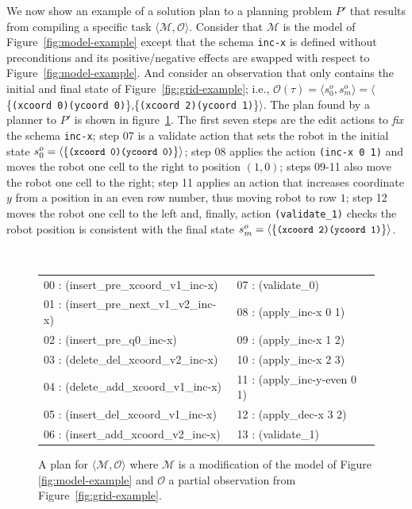 \documentclass[letterpaper]{article} %
\newcommand{\tup}[1]{{\langle #1 \rangle}}
\begin{document}
We now show an example of a solution plan to a planning problem $P'$ that results from compiling a specific task $\tup{\mathcal{M},\mathcal{O}}$. Consider that $\mathcal{M}$ is the model of Figure~\ref{fig:model-example} except that the schema {\tt\small inc-x} is defined without preconditions and its positive/negative effects are swapped with respect to Figure~\ref{fig:model-example}. And consider an observation that only contains the initial and final state of Figure~\ref{fig:grid-example}; i.e., $\mathcal{O(\tau)}=\tup{s_0^o,s_m^o}=\langle$\{{\texttt{\small{(xcoord 0)(ycoord 0)}}}\},\{{\texttt{\small{(xcoord 2)(ycoord 1)}}}\}$\rangle $. The plan found by a planner to $P'$ is shown in figure~\ref{fig:plan-pdistance}. The first seven steps are the edit actions to \emph{fix} the schema {\tt\small inc-x}; step 07 is a validate action that sets the robot in the initial state $s_0^o=\tup{\{{\texttt{\small{(xcoord 0)(ycoord 0)}}}\}}$; step 08 applies the action {\tt\small (inc-x 0 1)} and moves the robot one cell to the right to position $(1,0)$; steps 09-11 also move the robot one cell to the right; step 11 applies an action that increases coordinate $y$ from a position in an even row number, thus moving robot to row $1$; step 12 moves the robot one cell to the left and, finally, action {\tt\small (validate\_1)} checks the robot position is consistent with the final state $s_m^o=\tup{\{{\texttt{\small{(xcoord 2)(ycoord 1)}}}\}}$.


\begin{figure}
\begin{tiny}
{\tt
\begin{tabular}{ll}
00 : (insert\_pre\_xcoord\_v1\_inc-x)   & 07 : (validate\_0)\\
01 : (insert\_pre\_next\_v1\_v2\_inc-x) & 08 : (apply\_inc-x 0 1)\\
02 : (insert\_pre\_q0\_inc-x)           & 09 : (apply\_inc-x 1 2)\\
03 : (delete\_del\_xcoord\_v2\_inc-x)   & 10 : (apply\_inc-x 2 3) \\
04 : (delete\_add\_xcoord\_v1\_inc-x)   & 11 : (apply\_inc-y-even 0 1)\\
05 : (insert\_del\_xcoord\_v1\_inc-x)   & 12 : (apply\_dec-x 3 2)\\
06 : (insert\_add\_xcoord\_v2\_inc-x)   & 13 : (validate\_1)
\end{tabular}
}
\end{tiny}
 \caption{A plan for $\tup{\mathcal{M},\mathcal{O}}$ where $\mathcal{M}$ is a modification of the model of Figure \ref{fig:model-example} and $\mathcal{O}$ a partial observation from Figure~\ref{fig:grid-example}.}
\label{fig:plan-pdistance}
\end{figure}
\end{document}
